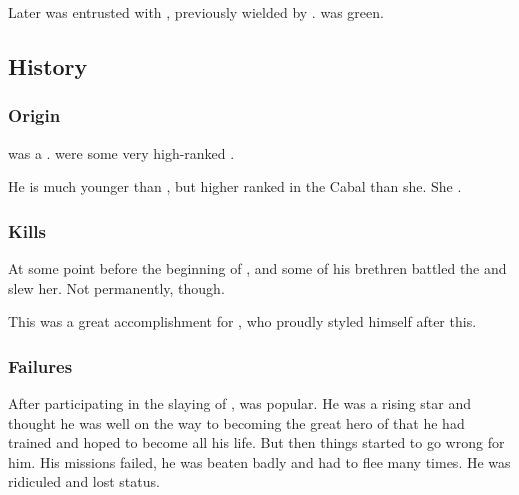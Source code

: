 \index{\Ossiraith}
Later \Teshrial{} was entrusted with \Ossiraith, previously wielded by \Menessiaraid. 
\Ossiraith{} was green. 









\subsection{History}





\subsubsection{Origin}
\Teshrial{} was a \ketheran. 
 were some very high-ranked \resphain. 

He is much younger than , but higher ranked in the Cabal than she. 
She .





\subsubsection{Kills \Zessuruch}
At some point before the beginning of \emph{\TwilightAngelRemember{}}, \Teshrial and some of his brethren battled the \dragon {} and slew her. 
Not permanently, though. 

This was a great accomplishment for \Teshrial, who proudly styled himself  after this. 





\subsubsection{Failures}
After participating in the slaying of \Zessuruch, \Teshrial was popular. 
He was a rising star and thought he was well on the way to becoming the great hero of \CiriathSepher that he had trained and hoped to become all his life. 
But then things started to go wrong for him. 
His missions failed, he was beaten badly and had to flee many times. 
He was ridiculed and lost status. 

